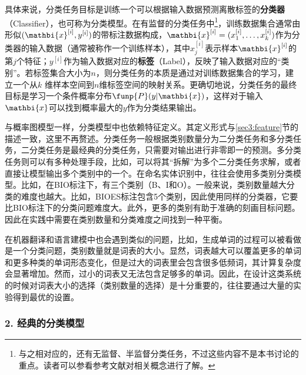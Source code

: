 \parinterval 具体来说，分类任务目标是训练一个可以根据输入数据预测离散标签的{\small\sffamily\bfseries{分类器}}（Classifier），也可称为分类模型。在有监督的分类任务中\footnote{与之相对应的，还有无监督、半监督分类任务，不过这些内容不是本书讨论的重点。读者可以参看参考文献对相关概念进行了解。}，训练数据集合通常由形似$({\mathbi{x}}^{[i]},y^{[i]})$的带标注数据构成，${\mathbi{x}}^{[i]}=(x^{[i]}_1,\ldots,x^{[i]}_k)$作为分类器的输入数据（通常被称作一个训练样本），其中$x^{[i]}_j$表示样本$\mathbi{x}^{[i]}$的第$j$个特征；$y^{[i]}$作为输入数据对应的{\small\sffamily\bfseries{标签}}（Label），反映了输入数据对应的“类别”。若标签集合大小为$n$，则分类任务的本质是通过对训练数据集合的学习，建立一个从$k$ 维样本空间到$n$维标签空间的映射关系。更确切地说，分类任务的最终目标是学习一个条件概率分布$\funp{P}(y|{\mathbi{x}})$，这样对于输入${\mathbi{x}}$可以找到概率最大的$y$作为分类结果输出。

\parinterval 与概率图模型一样，分类模型中也依赖特征定义。其定义形式与\ref{sec3:feature}节的描述一致，这里不再赘述。分类任务一般根据类别数量分为二分类任务和多分类任务，二分类任务是最经典的分类任务，只需要对输出进行非零即一的预测。多分类任务则可以有多种处理手段，比如，可以将其“拆解”为多个二分类任务求解，或者直接让模型输出多个类别中的一个。在命名实体识别中，往往会使用多类别分类模型。比如，在BIO标注下，有三个类别（B、I和O）。一般来说，类别数量越大分类的难度也越大。比如，BIOES标注包含5个类别，因此使用同样的分类器，它要比BIO标注下的分类问题难度大。此外，更多的类别有助于准确的刻画目标问题。因此在实践中需要在类别数量和分类难度之间找到一种平衡。

\parinterval 在机器翻译和语言建模中也会遇到类似的问题，比如，生成单词的过程可以被看做是一个分类问题，类别数量就是词表的大小。显然，词表越大可以覆盖更多的单词和更多种类的单词形态变化，但是过大的词表里会包含很多低频词，其计算复杂度会显著增加。然而，过小的词表又无法包含足够多的单词。因此，在设计这类系统的时候对词表大小的选择（类别数量的选择）是十分重要的，往往要通过大量的实验得到最优的设置。


\subsubsection{2. 经典的分类模型}

